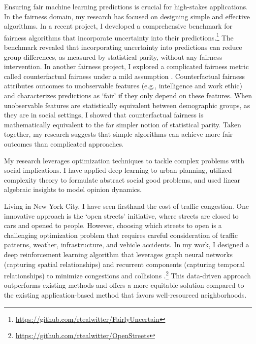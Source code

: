 \documentclass[11pt]{article}
\begin{document}
Ensuring fair machine learning predictions is crucial for high-stakes applications.
In the fairness domain, my research has focused on designing simple and effective algorithms.
In a recent project, I developed a comprehensive benchmark for fairness algorithms that incorporate uncertainty into their predictions.\footnote{\url{https://github.com/rtealwitter/FairlyUncertain}}
The benchmark revealed that incorporating uncertainty into predictions can reduce group differences, as measured by statistical parity, without any fairness intervention.
In another fairness project, I explored a complicated fairness metric called counterfactual fairness under a mild assumption \cite{rosenblatt2023counterfactual}.
Counterfactual fairness attributes outcomes to unobservable features (e.g., intelligence and work ethic) and characterizes predictions as `fair' if they only depend on these features.
When unobservable features are statistically equivalent between demographic groups, as they are in social settings, I showed that counterfactual fairness is mathematically equivalent to the far simpler notion of statistical parity.
Taken together, my research suggests that simple algorithms can achieve more fair outcomes than complicated approaches.


My research leverages optimization techniques to tackle complex problems with social implications.
I have applied deep learning to urban planning, utilized complexity theory to formulate abstract social good problems, and used linear algebraic insights to model opinion dynamics.

Living in New York City, I have seen firsthand the cost of traffic congestion.
One innovative approach is the `open streets' initiative, where streets are closed to cars and opened to people.
However, choosing which streets to open is a challenging optimization problem that requires careful consideration of traffic patterns, weather, infrastructure, and vehicle accidents.
In my work, I designed a deep reinforcement learning algorithm that leverages graph neural networks (capturing spatial relationships) and recurrent components (capturing temporal relationships) to minimize congestions and collisions \cite{witter2024i}.\footnote{\url{https://github.com/rtealwitter/OpenStreets}}
This data-driven approach outperforms existing methods and offers a more equitable solution compared to the existing application-based method that favors well-resourced neighborhoods.
\end{document}
